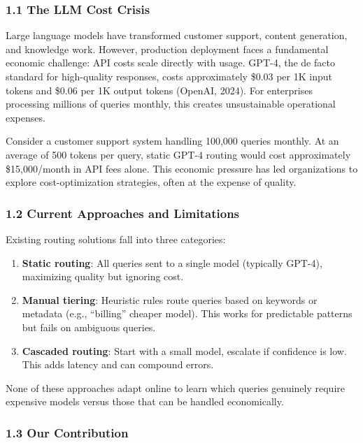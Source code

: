 \hypertarget{the-llm-cost-crisis}{%
\subsubsection{1.1 The LLM Cost Crisis}\label{the-llm-cost-crisis}}

Large language models have transformed customer support, content
generation, and knowledge work. However, production deployment faces a
fundamental economic challenge: API costs scale directly with usage.
GPT-4, the de facto standard for high-quality responses, costs
approximately \$0.03 per 1K input tokens and \$0.06 per 1K output tokens
(OpenAI, 2024). For enterprises processing millions of queries monthly,
this creates unsustainable operational expenses.

Consider a customer support system handling 100,000 queries monthly. At
an average of 500 tokens per query, static GPT-4 routing would cost
approximately \$15,000/month in API fees alone. This economic pressure
has led organizations to explore cost-optimization strategies, often at
the expense of quality.

\hypertarget{current-approaches-and-limitations}{%
\subsubsection{1.2 Current Approaches and
Limitations}\label{current-approaches-and-limitations}}

Existing routing solutions fall into three categories:

\begin{enumerate}
\def\labelenumi{\arabic{enumi}.}
\tightlist
\item
  \textbf{Static routing}: All queries sent to a single model (typically
  GPT-4), maximizing quality but ignoring cost.
\item
  \textbf{Manual tiering}: Heuristic rules route queries based on
  keywords or metadata (e.g., ``billing'' cheaper model). This works for
  predictable patterns but fails on ambiguous queries.
\item
  \textbf{Cascaded routing}: Start with a small model, escalate if
  confidence is low. This adds latency and can compound errors.
\end{enumerate}

None of these approaches adapt online to learn which queries genuinely
require expensive models versus those that can be handled economically.

\hypertarget{our-contribution}{%
\subsubsection{1.3 Our Contribution}\label{our-contribution}}

